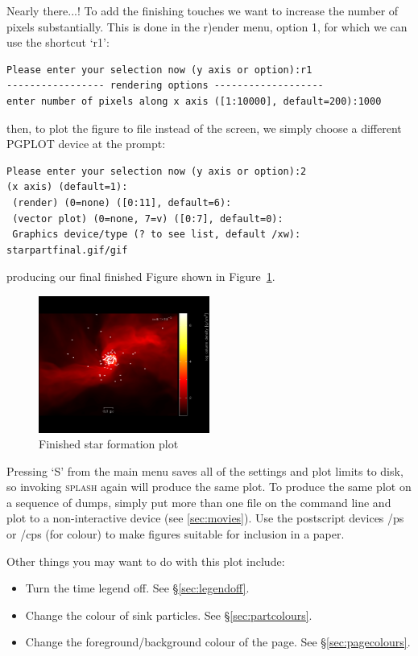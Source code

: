 \documentclass[a4paper,10pt]{article}
\newcommand{\splash}{\textsc{splash }}
\begin{document}
 Nearly there...! To add the finishing touches we want to increase the number of pixels substantially. This is done in the r)ender menu, option 1, for which we can use the shortcut `r1':
\begin{verbatim}
Please enter your selection now (y axis or option):r1
----------------- rendering options -------------------
enter number of pixels along x axis ([1:10000], default=200):1000
\end{verbatim}
then, to plot the figure to file instead of the screen, we simply choose a different PGPLOT device at the prompt:
\begin{verbatim}
Please enter your selection now (y axis or option):2
(x axis) (default=1):
 (render) (0=none) ([0:11], default=6):
 (vector plot) (0=none, 7=v) ([0:7], default=0):
 Graphics device/type (? to see list, default /xw): starpartfinal.gif/gif
\end{verbatim}
producing our final finished Figure shown in Figure~\ref{fig:starfinal}.
\begin{figure}[h!]
\begin{center}
\includegraphics[width=0.5\textwidth]{starpartfinal.png}
\caption{Finished star formation plot}
\label{fig:starfinal}
\end{center}
\end{figure}

 Pressing `S' from the main menu saves all of the settings and plot limits to disk, so invoking \splash again will produce the same plot. To produce the same plot on a sequence of dumps, simply put more than one file on the command line and plot to a non-interactive device (see \ref{sec:movies}). Use the postscript devices /ps or /cps (for colour) to make figures suitable for inclusion in a paper.

Other things you may want to do with this plot include:
\begin{itemize}
\item Turn the time legend off. See \S\ref{sec:legendoff}.
\item Change the colour of sink particles. See \S\ref{sec:partcolours}.
\item Change the foreground/background colour of the page. See \S\ref{sec:pagecolours}.
\end{itemize}
\end{document}

